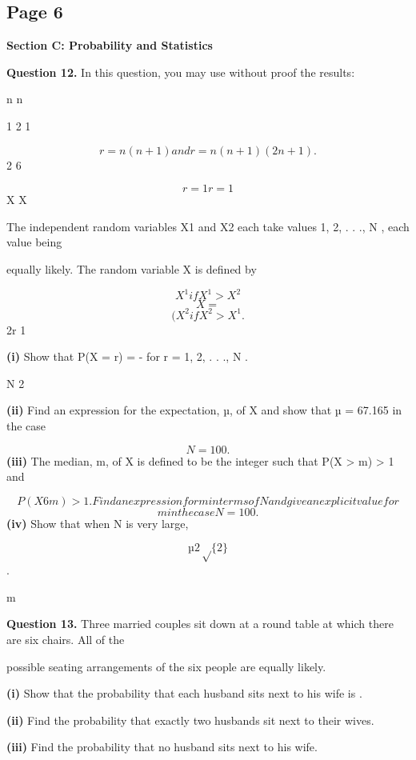 \documentclass[12pt]{article}
\begin{document}
\subsection*{Page 6}
\begin{flushleft}
\bigskip\textbf{Section C: Probability and Statistics}\par
\bigskip\textbf{Question 12.} In this question, you may use without proof the results:\par
n n\par
1 2 1\par
\[r = n(n + 1) and r = n(n + 1)(2n + 1) .\]
2 6\par
\[r=1 r=1\]
X X\par
The independent random variables X1 and X2 each take values 1, 2, . . ., N , each value being\par
equally likely. The random variable X is defined by\par
\[X^1 if X^1 > X^2\]
\[X =\]
\[(X^2 if X^2 > X^1 .\]
2r 1\par
\textbf{(i)} Show that P(X = r) = - for r = 1, 2, . . ., N .\par
N 2\par
\textbf{(ii)} Find an expression for the expectation, µ, of X and show that µ = 67.165 in the case\par
\[N = 100.\]
\textbf{(iii)} The median, m, of X is defined to be the integer such that P(X > m) > 1 and\par
\[P(X 6 m) > 1 . Find an expression for m in terms of N and give an explicit value for\]
\[m in the case N = 100.\]
\textbf{(iv)} Show that when N is very large,\par
\[µ 2\sqrt\{2\}\]
.\par
m \par
\bigskip\textbf{Question 13.} Three married couples sit down at a round table at which there are six chairs. All of the\par
possible seating arrangements of the six people are equally likely.\par
\textbf{(i)} Show that the probability that each husband sits next to his wife is .\par
\textbf{(ii)} Find the probability that exactly two husbands sit next to their wives.\par
\textbf{(iii)} Find the probability that no husband sits next to his wife.\par
\end{flushleft}
\end{document}
